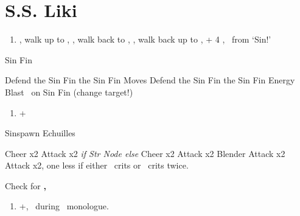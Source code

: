 \chapter{S.S. Liki}

\begin{enumerate}
	\item \cs[2:00], walk up to \yuna, \sd, walk back to \wakka, \sd, walk back up to \yuna, \cs + 4 \skippablefmv[4:20], \sd\ from `Sin!'
\end{enumerate}
\begin{battle}[2000]{Sin Fin}
	\begin{itemize}
		\tidusf Defend
		\switch{\yuna}{\lulu}
		\luluf \thunder{} the Sin Fin
		\kimahrif \lancet{} the Sin Fin
		\enemyf Moves
		\tidusf Defend
		\kimahrif \lancet{} the Sin Fin
		\luluf \thunder{} the Sin Fin
		\switch{\tidus}{\yuna}
		\summon{\valefor}
		\valeforf Energy Blast \od\ on Sin Fin (change target!)
	\end{itemize}
\end{battle}
\begin{enumerate}[resume]
	\item \fmv+\cs[1:40]
\end{enumerate}
\begin{battle}[2000]{Sinspawn Echuilles}
	\begin{itemize}
		\tidusf Cheer x2
		\wakkaf \darkattack{}
		\tidusf Attack x2 \textit{if Str Node else} Cheer x2
		\wakkaf Attack x2
		\enemyf Blender
		\wakkaf Attack x2
		\tidusf Attack x2, one less if either \tidus\ crits or \wakka\ crits twice.
		\tidusf \od
	\end{itemize}
	Check for \textbf{\icebrand{}, \iceball{}}
\end{battle}
\begin{enumerate}[resume]
	\item \skippablefmv+\cs[1:30], \sd\ during \tidus\ monologue.
\end{enumerate}